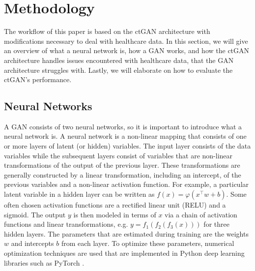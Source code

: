 \documentclass[review,12pt]{elsarticle}
\begin{document}
\section{ Methodology}
The workflow of this paper is based on the ctGAN architecture \cite{ctgan} with modifications necessary to deal with healthcare data. In this section, we will give an overview of what a neural network is, how a GAN works, and how the ctGAN architecture handles issues encountered with healthcare data, that the GAN architecture struggles with. Lastly, we will elaborate on how to evaluate the ctGAN's performance. \\


\subsection{Neural Networks} 
A GAN consists of two neural networks, so it is important to introduce what a neural network is. A neural network is a non-linear mapping that consists of one or more layers of latent (or hidden) variables. The input layer consists of the data variables while the subsequent layers consist of variables that are non-linear transformations of the output of the previous layer. These transformations are generally constructed by a linear transformation, including an intercept, of the previous variables and a non-linear activation function. For example, a particular latent variable in a hidden layer can be written as $f(x) = \varphi(x^\top w + b)$. Some often chosen activation functions are a rectified linear unit (RELU) and a sigmoid. The output $y$ is then modeled in terms of $x$ via a chain of activation functions and linear transformations, e.g. $y = f_1(f_2(f_3(x)))$ for three hidden layers. The parameters that are estimated during training are the weights $w$ and intercepts $b$ from each layer. To optimize these parameters, numerical optimization techniques are used that are implemented in Python deep learning libraries such as PyTorch \cite{NEURIPS2019_9015}. 
\\
\end{document}
